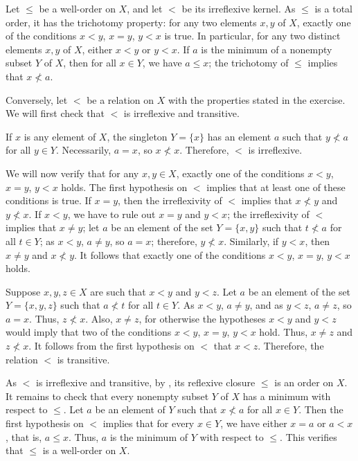\documentclass{article}
\begin{document}
\begin{solution}
  \label{sol:yuziburm}
  Let \(\leq\) be a well-order on \(X\), and let \(<\) be its
  irreflexive kernel.  As \(\leq\) is a total order, it has the
  trichotomy property: for any two elements \(x, y\) of \(X\), exactly
  one of the conditions \(x < y\), \(x = y\), \(y < x\) is true.  In
  particular, for any two distinct elements \(x, y\) of \(X\), either
  \(x < y\) or \(y < x\).  If \(a\) is the minimum of a nonempty
  subset \(Y\) of \(X\), then for all \(x \in Y\), we have
  \(a \leq x\); the trichotomy of \(\leq\) implies that
  \(x \nless a\).

  Conversely, let \(<\) be a relation on \(X\) with the properties
  stated in the exercise.  We will first check that \(<\) is
  irreflexive and transitive.

  If \(x\) is any element of \(X\), the singleton \(Y = \{ x \}\) has
  an element \(a\) such that \(y \nless a\) for all \(y \in Y\).
  Necessarily, \(a = x\), so \(x \nless x\).  Therefore, \(<\) is
  irreflexive.

  We will now verify that for any \(x, y \in X\), exactly one of the
  conditions \(x < y\), \(x = y\), \(y < x\) holds.  The first
  hypothesis on \(<\) implies that at least one of these conditions is
  true.  If \(x = y\), then the irreflexivity of \(<\) implies that
  \(x \nless y\) and \(y \nless x\).  If \(x < y\), we have to rule
  out \(x = y\) and \(y < x\); the irreflexivity of \(<\) implies that
  \(x \neq y\); let \(a\) be an element of the set \(Y = \{ x, y \}\)
  such that \(t \nless a\) for all \(t \in Y\); as \(x < y\),
  \(a \neq y\), so \(a = x\); therefore, \(y \nless x\).  Similarly,
  if \(y < x\), then \(x \neq y\) and \(x \nless y\).  It follows that
  exactly one of the conditions \(x < y\), \(x = y\), \(y < x\) holds.

  Suppose \(x, y, z \in X\) are such that \(x < y\) and \(y < z\).
  Let \(a\) be an element of the set \(Y = \{ x, y, z \}\) such that
  \(a \nless t\) for all \(t \in Y\).  As \(x < y\), \(a \neq y\), and
  as \(y < z\), \(a \neq z\), so \(a = x\).  Thus, \(z \nless x\).
  Also, \(x \neq z\), for otherwise the hypotheses \(x < y\) and
  \(y < z\) would imply that two of the conditions \(x < y\),
  \(x = y\), \(y < x\) hold.  Thus, \(x \neq z\) and \(z \nless x\).
  It follows from the first hypothesis on \(<\) that \(x < z\).
  Therefore, the relation \(<\) is transitive.

  As \(<\) is irreflexive and transitive, by , its
  reflexive closure \(\leq\) is an order on \(X\).  It remains to
  check that every nonempty subset \(Y\) of \(X\) has a minimum with
  respect to \(\leq\).  Let \(a\) be an element of \(Y\) such that
  \(x \nless a\) for all \(x \in Y\).  Then the first hypothesis on
  \(<\) implies that for every \(x \in Y\), we have either \(x = a\)
  or \(a < x\), that is, \(a \leq x\).  Thus, \(a\) is the minimum of
  \(Y\) with respect to \(\leq\).  This verifies that \(\leq\) is a
  well-order on \(X\).
\end{solution}
\end{document}
